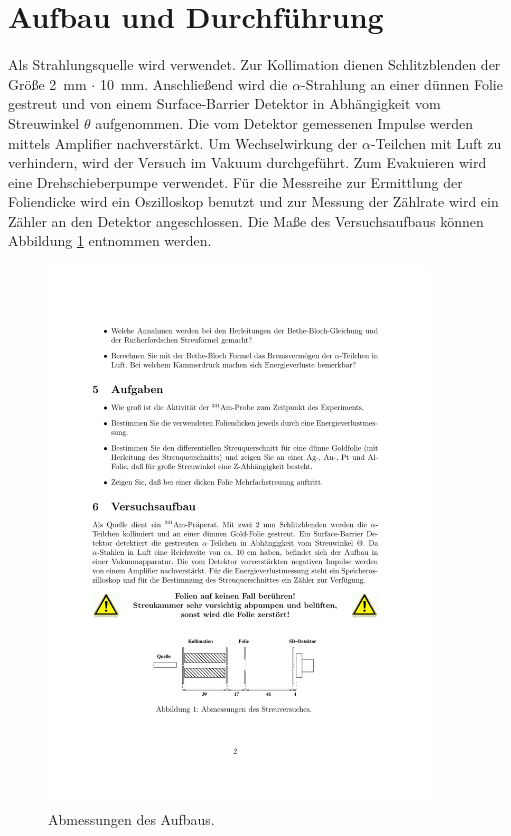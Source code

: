 \section {Aufbau und Durchführung}
\label{sec:durchführung}

Als Strahlungsquelle wird  verwendet. Zur Kollimation dienen Schlitzblenden der Größe \SI{2}{\milli\meter} $\cdot$ \SI{10}{\milli\meter}. Anschließend wird die $\alpha$-Strahlung an einer dünnen Folie gestreut und von einem Surface-Barrier Detektor in Abhängigkeit vom Streuwinkel $\theta$ aufgenommen. Die vom Detektor gemessenen Impulse werden mittels Amplifier nachverstärkt. Um Wechselwirkung der $\alpha$-Teilchen mit Luft zu verhindern, wird der Versuch im Vakuum durchgeführt. Zum Evakuieren wird eine Drehschieberpumpe verwendet. Für die Messreihe zur Ermittlung der Foliendicke wird ein Oszilloskop benutzt und zur Messung der Zählrate wird ein Zähler an den Detektor angeschlossen. Die Maße des Versuchsaufbaus können Abbildung \ref{fig:aufbau} entnommen werden.

\begin{figure}
	\centering
  \includegraphics[width=0.9\textwidth] {content/aufbau.pdf}
	\caption{Abmessungen des Aufbaus. \cite{anleitung16}}
	\label{fig:aufbau}
\end{figure}

